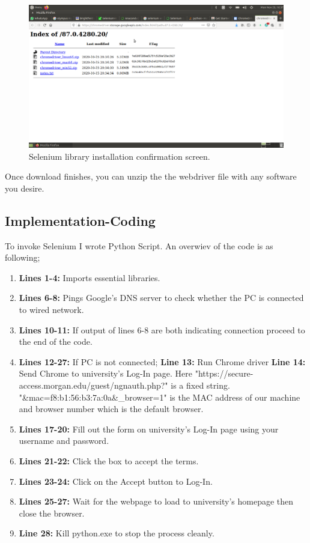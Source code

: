 \begin{figure}[H]
    \centering
    \includegraphics[angle=0,origin=c,width = .8\linewidth]{Section_Ethernet/Figures/PickWebDriver.png}
    \caption{Selenium library installation confirmation screen.}
    \label{fig:SeleniumWebDriver}
\end{figure}

Once download finishes, you can unzip the the webdriver file with any software you 
desire.

\subsection{Implementation-Coding}
To invoke Selenium I wrote Python Script. An overwiev of the code is as 
following;

\begin{enumerate}

 \item \textbf{Lines 1-4:} Imports essential libraries.
 \item \textbf{Lines 6-8:} Pings Google's DNS server to check whether the PC
        is connected to wired network. 
 \item \textbf{Lines 10-11:} If output of lines 6-8 are both indicating connection
        proceed to the end of the code.
 \item \textbf{Lines 12-27:} If PC is not connected;
 \textbf{Line 13:} Run Chrome driver
 \textbf{Line 14:} Send Chrome to university's Log-In page.
 Here "https://secure-access.morgan.edu/guest/ngnauth.php?" is a fixed string.
 "\&mac=f8:b1:56:b3:7a:0a\&\_browser=1" is the MAC address of our machine and
 browser number which is the default browser.
 \item \textbf{Lines 17-20:} Fill out the form on university's Log-In page
 using your username and password.
 \item \textbf{Lines 21-22:} Click the box to accept the terms.
 \item \textbf{Lines 23-24:} Click on the Accept button to Log-In.
 \item \textbf{Lines 25-27:} Wait for the webpage to load to university's homepage
 then close the browser.
 \item \textbf{Line 28:} Kill python.exe to stop the process cleanly.

\end{enumerate}



